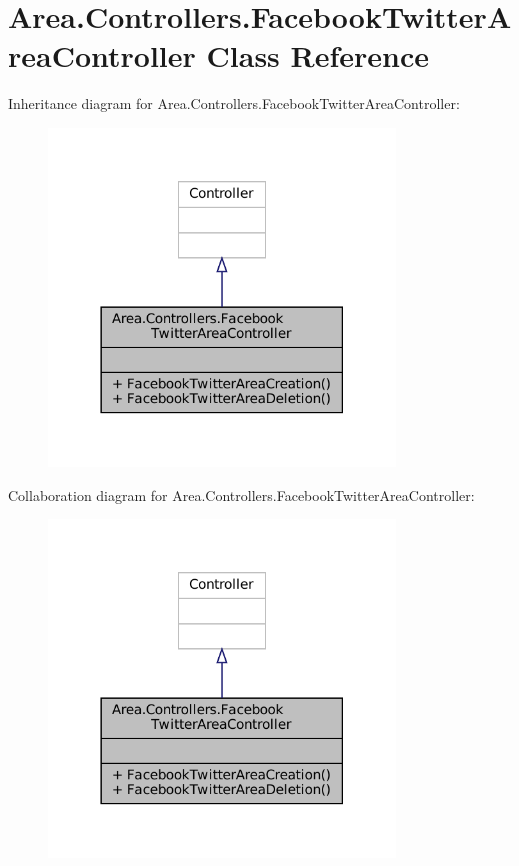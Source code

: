 \hypertarget{classArea_1_1Controllers_1_1FacebookTwitterAreaController}{}\section{Area.\+Controllers.\+Facebook\+Twitter\+Area\+Controller Class Reference}
\label{classArea_1_1Controllers_1_1FacebookTwitterAreaController}


Inheritance diagram for Area.\+Controllers.\+Facebook\+Twitter\+Area\+Controller\+:
\nopagebreak
\begin{figure}[H]
\begin{center}
\leavevmode
\includegraphics[width=261pt]{classArea_1_1Controllers_1_1FacebookTwitterAreaController__inherit__graph}
\end{center}
\end{figure}


Collaboration diagram for Area.\+Controllers.\+Facebook\+Twitter\+Area\+Controller\+:
\nopagebreak
\begin{figure}[H]
\begin{center}
\leavevmode
\includegraphics[width=261pt]{classArea_1_1Controllers_1_1FacebookTwitterAreaController__coll__graph}
\end{center}
\end{figure}
